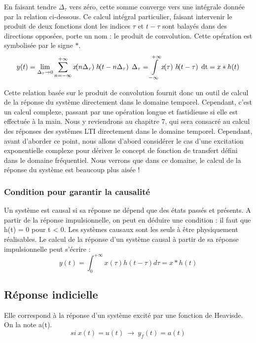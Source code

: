 	En faisant tendre $ \Delta_\tau $ vers zéro, cette somme
        converge vers une intégrale donnée par la relation
        ci-dessous. Ce calcul intégral particulier, faisant intervenir
        le produit de deux fonctions dont les indices $\tau $ et
        $t-\tau $ sont balayés dans des directions opposées, porte un
        nom : le produit de convolution. Cette opération est
        symbolisée par le signe $*$.
	\begin{equation}\label{Demo_produit_convolution}
          y(t) = \lim_{\Delta_\tau \to 0} \somme{n=-\infty}{+\infty}{x\de{n\Delta_\tau}}  \;  h\de{t-n\Delta_\tau}\;\Delta_\tau = \intDt{-\infty}{+\infty}{x\de{\tau}\, h\de{t-\tau}} = x*h(t)
	\end{equation}
	
	Cette relation basée sur le produit de convolution fournit
        donc un outil de calcul de la réponse du système directement
        dans le domaine temporel. Cependant, c'est un calcul complexe,
        passant par une opération longue et fastidieuse si elle est
        effectuée à la main. Nous y reviendrons au chapitre 7, qui
        sera consacré au calcul des réponses des systèmes LTI
        directement dans le domaine temporel. Cependant, avant
        d'aborder ce point, nous allons d'abord considérer le cas
        d'une excitation exponentielle complexe pour dériver le
        concept de fonction de transfert défini dans le domaine
        fréquentiel. Nous verrons que dans ce domaine, le calcul de la
        réponse du système est beaucoup plus aisée !
	
	\subsubsection{Condition pour garantir la causalité}
	Un système est causal si sa réponse ne dépend que des états
        passés et présents. A partir de la réponse impulsionnelle, on
        peut en déduire une condition : il faut que h(t) = 0 pour t <
        0. Les systèmes causaux sont les seuls à être physiquement
        réalisables. Le calcul de la réponse d'un système causal à
        partir de sa réponse impulsionnelle peut s'écrire :
	\begin{equation}\label{}
          y(t) = \int_{0}^{+ \infty} x(\tau)  h(t-\tau)d\tau = x*h(t)
	\end{equation}
	\vspace{1\baselineskip}
	
	\subsection{Réponse indicielle}
	Elle correspond à la réponse d'un système excité par une
        fonction de Heavisde. On la note a(t).
	\begin{equation}\label{key}
          si~x(t)=u(t)~\rightarrow ~y_{f}(t)=a(t)
	\end{equation}

